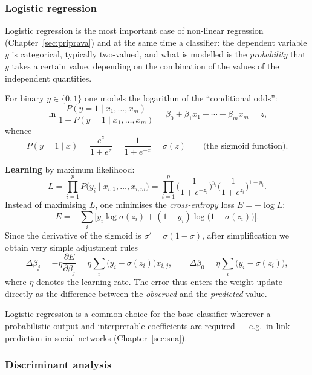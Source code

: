 \documentclass[11pt,a4paper]{article}
\theoremstyle{definition}
\providecommand{\uv}[1]{``#1''}
\begin{document}
\subsubsection{Logistic regression}
\label{ssec:logreg}

Logistic regression is the most important case of non-linear regression
(Chapter~\ref{sec:priprava}) and at the same time a classifier: the dependent variable $y$ is
categorical, typically two-valued, and what is modelled is the \emph{probability} that $y$ takes
a certain value, depending on the combination of the values of the independent quantities.

\begin{defbox}
For binary $y\in\{0,1\}$ one models the logarithm of the \uv{conditional odds}:
\[ \ln\frac{P(y=1\mid x_1,\dots,x_m)}{1-P(y=1\mid x_1,\dots,x_m)}
   =\beta_0+\beta_1x_1+\cdots+\beta_mx_m=z, \]
whence
\[ P(y=1\mid x)=\frac{e^{z}}{1+e^{z}}=\frac{1}{1+e^{-z}}=\sigma(z)
   \qquad\text{(the sigmoid function).} \]

\textbf{Learning} by maximum likelihood:
\[ L=\prod_{i=1}^{p}P\big(y_i\mid x_{i,1},\dots,x_{i,m}\big)
   =\prod_{i=1}^{p}\Big(\frac{1}{1+e^{-z_i}}\Big)^{y_i}
     \Big(\frac{1}{1+e^{z_i}}\Big)^{1-y_i}. \]
Instead of maximising $L$, one minimises the \emph{cross-entropy} loss $E=-\log L$:
\[ E=-\sum_i\Big[y_i\log\sigma(z_i)+(1-y_i)\log\big(1-\sigma(z_i)\big)\Big]. \]
Since the derivative of the sigmoid is $\sigma'=\sigma(1-\sigma)$, after simplification we obtain
very simple adjustment rules
\[ \Delta\beta_j=-\eta\frac{\partial E}{\partial\beta_j}
   =\eta\sum_i\big(y_i-\sigma(z_i)\big)x_{i,j},\qquad
   \Delta\beta_0=\eta\sum_i\big(y_i-\sigma(z_i)\big), \]
where $\eta$ denotes the learning rate. The error thus enters the weight update directly as the
difference between the \emph{observed} and the \emph{predicted} value.
\end{defbox}

Logistic regression is a common choice for the base classifier wherever a probabilistic output
and interpretable coefficients are required --- e.g.\ in link prediction in social networks
(Chapter~\ref{sec:sna}).

\subsubsection{Discriminant analysis}
\label{ssec:da}
\end{document}
